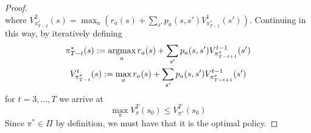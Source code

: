 \documentclass[11pt]{article}
\begin{document}
\begin{proof}
\[	\]
	where $V_{\pi^{*}_{T-2}}^{2}(s) = \max_{a}\left(r_{a}(s) + \sum_{s'} p_{a}(s,s') V_{\pi^{*}_{T-1}}^{1}(s')\right)$. Continuing in this way, by iteratively defining
	\begin{gather*}
		\pi_{T-t}^{*}(s) := \operatorname*{argmax}_{a} r_{a}(s) + \sum_{s'} p_{a}(s,s') V_{\pi^{*}_{T-t+1}}^{t-1}(s') \\
		V_{\pi^*_{T-t}}^{t}(s) := \max_{a} r_{a}(s) + \sum_{s'} p_{a}(s,s') V_{\pi^{*}_{T-t+1}}^{t-1}(s')
	\end{gather*}
	for $t=3,\ldots,T$ we arrive at 
	\[
		\max_{\pi} V_{\pi}^{T}(s_{0}) \leq V_{\pi^*}^{T}(s_{0})
	\]
	Since $\pi^* \in \Pi$ by definition, we must have that it is the optimal policy.
\end{proof}

%
\end{document}
